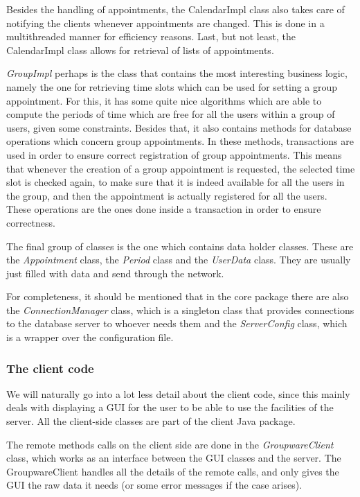 \documentclass[a4paper,10pt]{article}
\begin{document}
Besides the handling of appointments, the CalendarImpl class also takes care of notifying the
clients whenever appointments are changed. This is done in a multithreaded manner for
efficiency reasons. Last, but not least, the CalendarImpl class allows for retrieval of lists
of appointments.

\textit{GroupImpl} perhaps is the class that contains the most interesting business logic,
namely the one for retrieving time slots which can be used for setting a group appointment.
For this, it has some quite nice algorithms which are able to compute the periods of time
which are free for all the users within a group of users, given some constraints. Besides that,
it also contains methods for database operations which concern group appointments. In these
methods, transactions are used in order to ensure correct registration of group appointments.
This means that whenever the creation of a group appointment is requested, the selected
time slot is checked again, to make sure that it is indeed available for all the users in the group,
and then the appointment is actually registered for all the users. These operations are the
ones done inside a transaction in order to ensure correctness.

The final group of classes is the one which contains data holder classes. These are the
\textit{Appointment} class, the \textit{Period} class and the \textit{UserData} class. They
are usually just filled with data and send through the network.

For completeness, it should be mentioned that in the core package there are also the
\textit{ConnectionManager} class, which is a singleton class that provides connections
to the database server to whoever needs them and the \textit{ServerConfig} class,
which is a wrapper over the configuration file.

\subsubsection*{The client code}

We will naturally go into a lot less detail about the client code, since this mainly deals
with displaying a GUI for the user to be able to use the facilities of the server. All the
client-side classes are part of the client Java package.

The remote methods calls on the client side are done in the \textit{GroupwareClient} class,
which works as an interface between the GUI classes and the server. The GroupwareClient
handles all the details of the remote calls, and only gives the GUI the raw data it needs
(or some error messages if the case arises).
\end{document}
